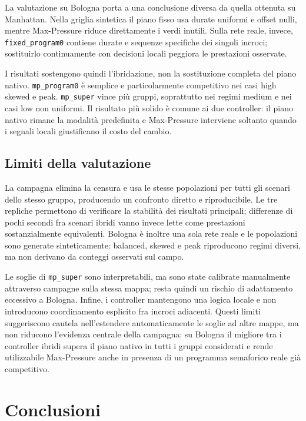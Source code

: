 \documentclass[12pt,a4paper,oneside]{report}
\numberwithin{equation}{chapter}
\begin{document}
La valutazione su Bologna porta a una conclusione diversa da quella ottenuta
su Manhattan. Nella griglia sintetica il piano fisso usa durate uniformi e
offset nulli, mentre Max-Pressure riduce direttamente i verdi inutili. Sulla
rete reale, invece, \texttt{fixed\_program0} contiene durate e sequenze
specifiche dei singoli incroci; sostituirlo continuamente con decisioni locali
peggiora le prestazioni osservate.

I risultati sostengono quindi l'ibridazione, non la sostituzione completa del
piano nativo. \texttt{mp\_program0} è semplice e particolarmente competitivo
nei casi high skewed e peak. \texttt{mp\_super} vince più gruppi, soprattutto
nei regimi medium e nei casi low non uniformi. Il risultato più solido è comune
ai due controller: il piano nativo rimane la modalità predefinita e
Max-Pressure interviene soltanto quando i segnali locali giustificano il costo
del cambio.

\section{Limiti della valutazione}

La campagna elimina la censura e usa le stesse popolazioni per tutti gli
scenari dello stesso gruppo, producendo un confronto diretto e riproducibile.
Le tre repliche permettono di verificare la stabilità dei risultati principali;
differenze di pochi secondi fra scenari ibridi vanno invece lette come
prestazioni sostanzialmente equivalenti. Bologna è inoltre una sola rete reale e
le popolazioni sono generate sinteticamente: balanced, skewed e peak
riproducono regimi diversi, ma non derivano da conteggi osservati sul campo.

Le soglie di \texttt{mp\_super} sono interpretabili, ma sono state calibrate
manualmente attraverso campagne sulla stessa mappa; resta quindi un rischio di
adattamento eccessivo a Bologna. Infine, i controller mantengono una logica
locale e non introducono coordinamento esplicito fra incroci adiacenti. Questi
limiti suggeriscono cautela nell'estendere automaticamente le soglie ad altre
mappe, ma non riducono l'evidenza centrale della campagna: su Bologna
il migliore tra i controller ibridi supera il piano nativo in tutti i gruppi
considerati e rende utilizzabile Max-Pressure anche in presenza di un programma
semaforico reale già competitivo.

\chapter{Conclusioni}
\label{chap:conclusioni}
\end{document}
